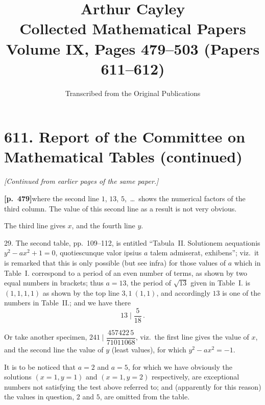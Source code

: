 \documentclass[11pt,a4paper]{article}
\title{\textbf{Arthur Cayley}\\\vspace{0.5em}
\Large Collected Mathematical Papers\\\vspace{0.3em}
\large Volume IX, Pages 479--503 (Papers 611--612)}
\author{Transcribed from the Original Publications}
\date{}
\begin{document}
\maketitle
\thispagestyle{empty}

\tableofcontents
\newpage

\section*{\textbf{611.} Report of the Committee on Mathematical Tables (continued)}

\textit{[Continued from earlier pages of the same paper.]}

\bigskip

\noindent\textbf{[p.~479]}\quad where the second line $1$, $13$, $5$,~\ldots\ shows the numerical factors of the third column. The value of this second line as a result is not very obvious.

The third line gives $x$, and the fourth line $y$.

29. The second table, pp.~109--112, is entitled ``Tabula~II. Solutionem aequationis $y^{2} - ax^{2} + 1 = 0$, quotiescunque valor ipsius $a$ talem admiserat, exhibens''; viz.\ it is remarked that this is only possible (but see infra) for those values of $a$ which in Table~I. correspond to a period of an even number of terms, as shown by two equal numbers in brackets; thus $a = 13$, the period of $\sqrt{13}$ given in Table~I. is $(1, 1, 1, 1)$ as shown by the top line $3, 1\ (1, 1)$, and accordingly $13$ is one of the numbers in Table~II.; and we have there
\[
13 \mid \frac{5}{18}\,.
\]

Or take another specimen, $241 \mid \dfrac{457422\,5}{71011068}$, viz.\ the first line gives the value of $x$, and the second line the value of $y$ (least values), for which $y^{2} - ax^{2} = -1$.

It is to be noticed that $a = 2$ and $a = 5$, for which we have obviously the solutions $(x = 1, y = 1)$ and $(x = 1, y = 2)$ respectively, are exceptional numbers not satisfying the test above referred to; and (apparently for this reason) the values in question, $2$ and $5$, are omitted from the table.
\end{document}
